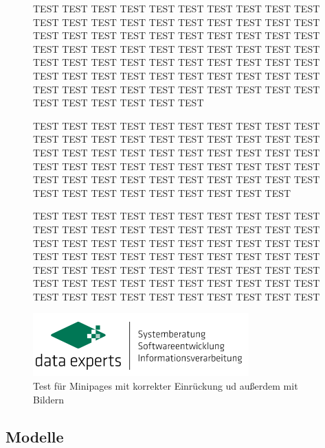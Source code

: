 \begin{figure}[H]
    \begin{minipage}{0.55\textwidth}

        TEST TEST TEST TEST TEST TEST TEST TEST TEST TEST TEST TEST TEST TEST TEST TEST TEST TEST TEST TEST TEST TEST TEST TEST TEST TEST TEST TEST TEST TEST TEST TEST TEST TEST TEST TEST TEST 
        TEST TEST TEST TEST TEST TEST TEST TEST TEST TEST TEST TEST TEST TEST TEST TEST TEST TEST TEST TEST TEST TEST TEST TEST TEST TEST TEST TEST TEST TEST TEST TEST TEST TEST TEST TEST TEST TEST TEST 
        
        TEST TEST TEST TEST TEST TEST TEST TEST TEST TEST TEST TEST TEST TEST TEST TEST TEST TEST TEST TEST TEST TEST TEST TEST TEST TEST TEST TEST TEST TEST TEST TEST TEST TEST TEST TEST TEST TEST TEST TEST TEST TEST TEST TEST TEST TEST TEST TEST TEST TEST TEST TEST TEST TEST TEST TEST TEST TEST TEST 

        TEST TEST TEST TEST TEST TEST TEST TEST TEST TEST TEST TEST TEST TEST TEST TEST TEST TEST TEST TEST TEST TEST TEST TEST TEST TEST TEST TEST TEST TEST TEST TEST TEST TEST TEST TEST TEST TEST TEST TEST TEST TEST TEST TEST TEST TEST TEST TEST TEST TEST TEST TEST TEST TEST TEST TEST TEST TEST TEST TEST TEST TEST TEST TEST TEST TEST TEST TEST TEST TEST 
    \end{minipage}
    \hspace{0.05\textwidth}
    \begin{minipage}{0.4\textwidth}
        \centering
        \includegraphics{image/data-experts-logo.png}
        \caption{Test für Minipages mit korrekter Einrückung ud außerdem mit Bildern}
        \label{fig:ex4}
    \end{minipage}
\end{figure}

\subsection{Modelle}

